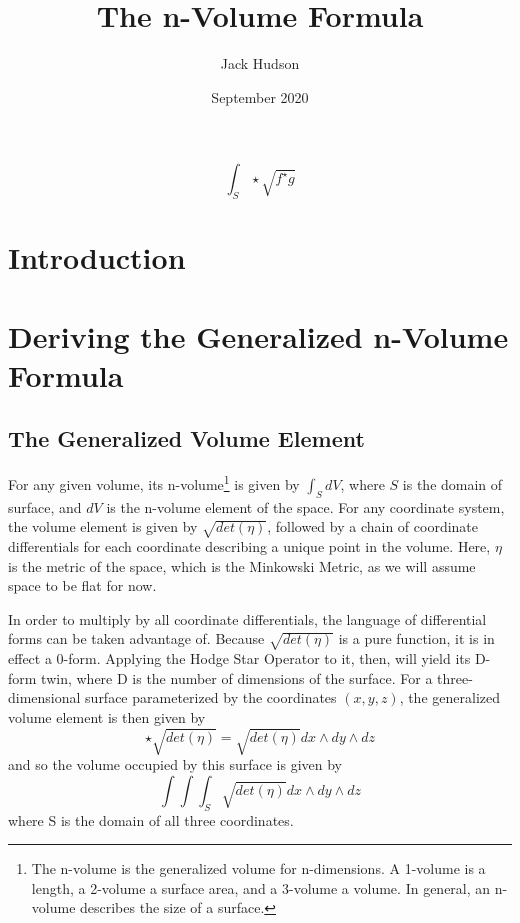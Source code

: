 \documentclass{article}
\title{The n-Volume Formula}
\author{Jack Hudson}
\date{September 2020}
\begin{document}
\maketitle

\[
\int_S \star \sqrt{f^{\star}g}
\]

\begin{abstract}
    
\end{abstract}

\section{Introduction}


\newpage
\tableofcontents
\newpage

\section{Deriving the Generalized n-Volume Formula}
\subsection{The Generalized Volume Element}
For any given volume, its n-volume\footnote{The n-volume is the generalized volume for n-dimensions. A 1-volume is a length, a 2-volume a surface area, and a 3-volume a volume. In general, an n-volume describes the size of a surface.} is given by $\int_S dV$, where $S$ is the domain of surface, and $dV$ is the n-volume element of the space. For any coordinate system, the volume element is given by $\sqrt{det(\eta)}$, followed by a chain of coordinate differentials for each coordinate describing a unique point in the volume. Here, $\eta$ is the metric of the space, which is the Minkowski Metric, as we will assume space to be flat for now.

In order to multiply by all coordinate differentials, the language of differential forms can be taken advantage of. Because $\sqrt{det(\eta)}$ is a pure function, it is in effect a 0-form. Applying the Hodge Star Operator to it, then, will yield its D-form twin, where D is the number of dimensions of the surface. For a three-dimensional surface parameterized by the coordinates $(x,y,z)$, the generalized volume element is then given by
\[
\star \sqrt{det(\eta)} = \sqrt{det(\eta)} dx \wedge dy \wedge dz
\]
and so the volume occupied by this surface is given by
\[
\int\int\int_S \sqrt{det(\eta)} dx \wedge dy \wedge dz
\]
where S is the domain of all three coordinates.
\end{document}

